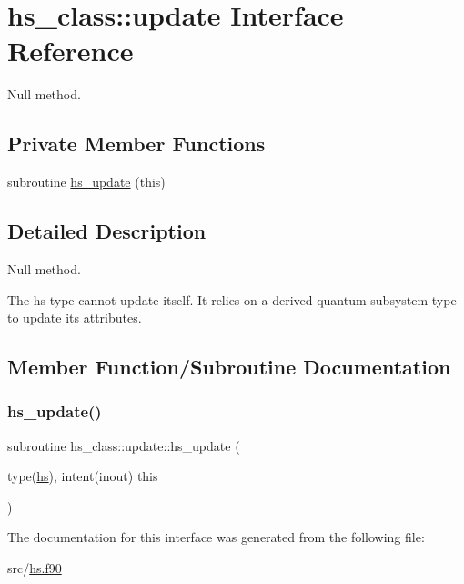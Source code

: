 \hypertarget{interfacehs__class_1_1update}{}\section{hs\+\_\+class\+:\+:update Interface Reference}
\label{interfacehs__class_1_1update}


Null method.  


\subsection*{Private Member Functions}
\begin{DoxyCompactItemize}
\item 
subroutine \hyperlink{interfacehs__class_1_1update_a39ea5fdfd7ff7644e33bdd4793e1cf10}{hs\+\_\+update} (this)
\end{DoxyCompactItemize}


\subsection{Detailed Description}
Null method. 

The hs type cannot update itself. It relies on a derived quantum subsystem type to update its attributes. 

\subsection{Member Function/\+Subroutine Documentation}
\mbox{\label{interfacehs__class_1_1update_a39ea5fdfd7ff7644e33bdd4793e1cf10}} 
\subsubsection{\texorpdfstring{hs\+\_\+update()}{hs\_update()}}
{\footnotesize\ttfamily subroutine hs\+\_\+class\+::update\+::hs\+\_\+update (\begin{DoxyParamCaption}\item[{type(\hyperlink{strucths__class_1_1hs}{hs}), intent(inout)}]{this }\end{DoxyParamCaption})\hspace{0.3cm}{\ttfamily [private]}}



The documentation for this interface was generated from the following file\+:\begin{DoxyCompactItemize}
\item 
src/\hyperlink{hs_8f90}{hs.\+f90}\end{DoxyCompactItemize}
